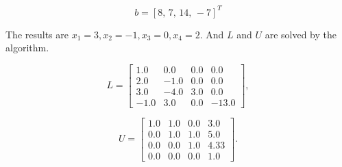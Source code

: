 \documentclass[preprint,12pt]{elsarticle}
\begin{document}
\begin{equation}
\label{eq:llb}
  b = [8,\,7,\,14,\,-7]^T
\end{equation}

The results are $x_1 = 3, x_2 = -1, x_3 = 0, x_4 = 2$. And $L$ and $U$ are solved by the algorithm.

\begin{equation}
  L = 
  \begin{bmatrix}
    1.0 & 0.0 & 0.0 & 0.0 \\
    2.0 & -1.0 & 0.0 & 0.0 \\
    3.0 & -4.0 & 3.0 & 0.0 \\
    -1.0 & 3.0 & 0.0 & -13.0
  \end{bmatrix},
\end{equation}

\begin{equation}
  U = 
  \begin{bmatrix}
    1.0 & 1.0 & 0.0 & 3.0 \\
    0.0 & 1.0 & 1.0 & 5.0 \\
    0.0 & 0.0 & 1.0 & 4.33 \\
    0.0 & 0.0 & 0.0 & 1.0
  \end{bmatrix}.
\end{equation}
\end{document}
